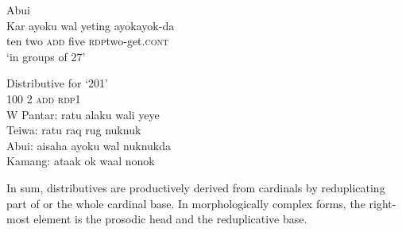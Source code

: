 \ea%
\label{bkm:Ref342661452}
{\upshape Abui}\\
\gll Kar   ayoku   wal   yeting   ayok{\Tilde}ayok-da\\  
   ten   two   \textsc{add}   five   \textsc{rdp}\textit{{\Tilde}}two-get.\textsc{cont} \\
\glt  `in groups of 27' 
\z
 



\let\eachwordone=\upshape
\let\eachwordtwo=\itshape 
\let\eachwordthree=\itshape 
\let\eachwordfour=\itshape 
\let\eachwordfive=\itshape 

\ea%
\label{bkm:Ref342656299} 
{\upshape Distributive for `201'} \\
\glllll  {} 100    2    \textsc{add}    \textsc{rdp}{\Tilde}1\\  
 {\upshape W Pantar:} ratu    alaku    wali     ye{\Tilde}ye        \\
 {\upshape Teiwa:}    ratu    raq    rug    nuk{\Tilde}nuk      \\
 {\upshape Abui:}     aisaha     ayoku    wal    nuk{\Tilde}nukda      \\
 {\upshape Kamang:}   ataak     ok     waal    no{\Tilde}nok     \\  
\z


\let\eachwordone=\itshape
\let\eachwordtwo=\upshape 
\let\eachwordthree=\upshape 
\let\eachwordfour=\upshape 
\let\eachwordfive=\upshape 
    

In sum, distributives are productively derived from cardinals by reduplicating part of or the whole cardinal base. In morphologically complex forms, the right-most element is the prosodic head and the reduplicative base. 


